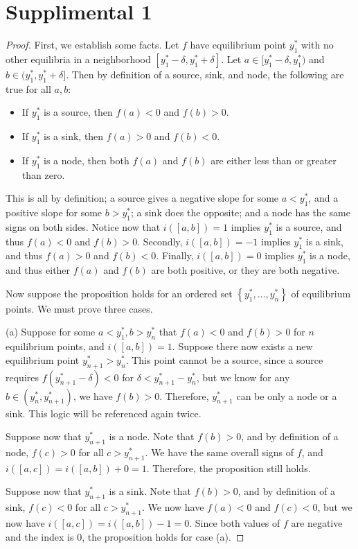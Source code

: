 \documentclass[11pt, letterpaper]{report}
\begin{document}
\section*{Supplimental 1}
\begin{proof}
	First, we establish some facts. Let $f$ have equilibrium point $y_1^*$ with no other equilibria in a neighborhood $[y_1^*-\delta ,y_1^*+\delta ]$. Let $a\in[y_1^*-\delta ,y_1^*)$ and $b\in(y_1^*,y_1^*+\delta ]$. Then by definition of a source, sink, and node, the following are true for all $a,b$:
	\begin{itemize}
		\item If $y_1^*$ is a source, then $f(a)<0$ and $f(b)>0$.
		\item If $y_1^*$ is a sink, then $f(a)>0$ and $f(b)<0$.
		\item If $y_1^*$ is a node, then both $f(a)$ and $f(b)$ are either less than or greater than zero.
	\end{itemize}
	This is all by definition; a source gives a negative slope for some $a<y_1^*$, and a positive slope for some $b>y_1^*$; a sink does the opposite; and a node has the same signs on both sides. Notice now that $i([a,b])=1$ implies $y_1^*$ is a source, and thus $f(a)<0$ and $f(b)>0$. Secondly, $i([a,b])=-1$ implies $y_1^*$ is a sink, and thus $f(a)>0$ and $f(b)<0$. Finally, $i([a,b])=0$ implies $y_1^*$ is a node, and thus either $f(a)$ and $f(b)$ are both positive, or they are both negative.

	Now suppose the proposition holds for an ordered set $\left\{ y^*_1, \dots, y^*_n  \right\} $ of equilibrium points. We must prove three cases.

	(a) Suppose for some $a<y_1^*,b>y_n^*$ that $f(a)<0$ and $f(b)>0$ for $n$ equilibrium points, and $i([a,b])=1$. Suppose there now exists a new equilibrium point $y_{n+1}^*>y_n^*$. This point cannot be a source, since a source requires $f(y_{n+1}^*-\delta )<0$ for $\delta <y_{n+1}^*-y_n^* $, but we know for any $b\in(y_n^*,y_{n+1}^*)$, we have $f(b)>0$. Therefore, $y_{n+1}^*$ can be only a node or a sink. This logic will be referenced again twice.

	Suppose now that $y_{n+1}^*$ is a node. Note that  $f(b)>0$, and by definition of a node, $f(c)>0$ for all $c>y_{n+1}^*$. We have the same overall signs of $f$, and $i([a,c])=i([a,b])+0=1$. Therefore, the proposition still holds.

	Suppose now that $y_{n+1}^*$ is a sink. Note that $f(b)>0$, and by definition of a sink, $f(c)<0$ for all $c>y_{n+1}^*$. We now have $f(a)<0$ and $f(c)<0$, but we now have $i([a,c])=i([a,b])-1=0$. Since both values of $f$ are negative and the index is 0, the proposition holds for case (a).


\end{proof}
\end{document}

